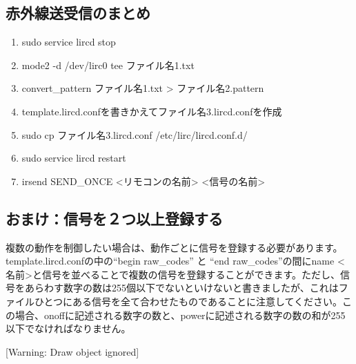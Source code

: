 \documentclass[a4paper,dvipdfmx]{jarticle}
\begin{document}
\subsection{赤外線送受信のまとめ}
\begin{enumerate}
\item sudo service lircd stop
\item mode2 -d /dev/lirc0{\textbar} tee ファイル名1.txt
\item convert\_pattern ファイル名1.txt {\textgreater}
ファイル名2.pattern
\item
template.lircd.confを書きかえてファイル名3.lircd.confを作成
\item sudo cp ファイル名3.lircd.conf /etc/lirc/lircd.conf.d/
\item sudo service lircd restart
\item irsend SEND\_ONCE {\textless}リモコンの名前{\textgreater}
{\textless}信号の名前{\textgreater}
\end{enumerate}
\subsection{おまけ：信号を２つ以上登録する}
複数の動作を制御したい場合は、動作ごとに信号を登録する必要があります。template.lircd.confの中の``begin
raw\_codes'' と ``end raw\_codes''の間にname
{\textless}名前{\textgreater}と信号を並べることで複数の信号を登録することができます。ただし、信号をあらわす数字の数は255個以下でないといけないと書きましたが、これはファイルひとつにある信号を全て合わせたものであることに注意してください。この場合、onoffに記述される数字の数と、powerに記述される数字の数の和が255以下でなければなりません。

[Warning: Draw object ignored]
\end{document}
